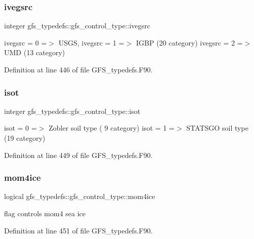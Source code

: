 \subsubsection{ivegsrc}
{\footnotesize\ttfamily integer gfs\+\_\+typedefs\+::gfs\+\_\+control\+\_\+type\+::ivegsrc}



ivegsrc = 0 =$>$ U\+S\+GS, ivegsrc = 1 =$>$ I\+G\+BP (20 category) ivegsrc = 2 =$>$ U\+MD (13 category) 



Definition at line 446 of file G\+F\+S\+\_\+typedefs.\+F90.

\mbox{\label{structgfs__typedefs_1_1gfs__control__type_aa9dc2c862dc3a7e31ed2be8dffed41b0}} 
\subsubsection{isot}
{\footnotesize\ttfamily integer gfs\+\_\+typedefs\+::gfs\+\_\+control\+\_\+type\+::isot}



isot = 0 =$>$ Zobler soil type ( 9 category) isot = 1 =$>$ S\+T\+A\+T\+S\+GO soil type (19 category) 



Definition at line 449 of file G\+F\+S\+\_\+typedefs.\+F90.

\mbox{\label{structgfs__typedefs_1_1gfs__control__type_a2ab616d6815643cf11f12f2eb95b515e}} 
\subsubsection{mom4ice}
{\footnotesize\ttfamily logical gfs\+\_\+typedefs\+::gfs\+\_\+control\+\_\+type\+::mom4ice}



flag controls mom4 sea ice 



Definition at line 451 of file G\+F\+S\+\_\+typedefs.\+F90.

\mbox{\label{structgfs__typedefs_1_1gfs__control__type_a51a37150a46a791063c531ee0e262316}} 
